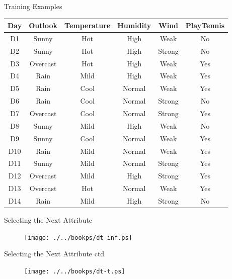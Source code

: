 \documentclass[%
pdf,
colorBG,
slideColor,
tcrico,
]{prosper}
\begin{document}
\begin{slide}{Training Examples } 
\tiny
	\begin{center}
	\begin{tabular}{cccccc} \hline
	\rowcolor[HTML]{99aabb} Day & Outlook & Temperature & Humidity & Wind & PlayTennis \\ \hline \hline
	\rowcolor[HTML]{bbccdd} D1 & Sunny & Hot & High & Weak & No \\
	\rowcolor[HTML]{ccddee} D2 & Sunny & Hot & High & Strong & No \\
	\rowcolor[HTML]{bbccdd} D3 & Overcast & Hot & High & Weak & Yes \\
	\rowcolor[HTML]{ccddee} D4 & Rain & Mild & High & Weak & Yes \\
	\rowcolor[HTML]{bbccdd} D5 & Rain & Cool & Normal & Weak & Yes \\
	\rowcolor[HTML]{ccddee} D6 & Rain & Cool & Normal & Strong & No \\
	\rowcolor[HTML]{bbccdd} D7 & Overcast & Cool & Normal & Strong & Yes \\
	\rowcolor[HTML]{ccddee} D8 & Sunny & Mild & High & Weak & No \\
	\rowcolor[HTML]{bbccdd} D9 & Sunny & Cool & Normal & Weak & Yes \\
	\rowcolor[HTML]{ccddee} D10 & Rain & Mild & Normal & Weak & Yes \\
	\rowcolor[HTML]{bbccdd} D11 & Sunny & Mild & Normal & Strong & Yes \\
	\rowcolor[HTML]{ccddee} D12 & Overcast & Mild & High & Strong & Yes \\
	\rowcolor[HTML]{bbccdd} D13 & Overcast & Hot & Normal & Weak & Yes \\
	\rowcolor[HTML]{ccddee} D14 & Rain & Mild & High & Strong & No \\  
	\end{tabular}
	\end{center}
\end{slide}

\begin{slide}{Selecting the Next Attribute  } 
\begin{figure}
	\centering
	\texttt{[image: ./../bookps/dt-inf.ps]}
\end{figure}
\end{slide}

\begin{slide}{Selecting the Next Attribute ctd } 
\begin{figure}
	\centering
	\texttt{[image: ./../bookps/dt-t.ps]}
\end{figure}
\end{slide}
\end{document}
